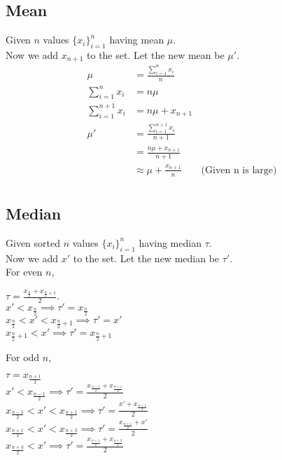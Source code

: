 \documentclass[11pt]{article}
\begin{document}
\subsection*{Mean}
Given $n$ values $\{x_i\}^n_{i=1}$ having mean $\mu$.\\
Now we add $x_{n+1}$ to the set. Let the new mean be $\mu'$.
\begin{equation*}
    \begin{split}
    \mu &= \frac{\sum_{i=1}^{n} x_i}{n} \\
    \sum_{i=1}^{n} x_i &= n\mu \\
    \sum_{i=1}^{n+1} x_i &= n\mu + x_{n+1} \\
    \mu' &= \frac{\sum_{i=1}^{n+1} x_i}{n+1} \\
        &= \frac{n\mu + x_{n+1}}{n+1} \\
        &\approx \mu + \frac{x_{n+1}}{n} \hspace{2em} \text{(Given n is large)} \\
    \end{split}
\end{equation*}

\subsection*{Median}
Given sorted $n$ values $\{x_i\}^n_{i=1}$ having median $\tau$. \\
Now we add $x'$ to the set. Let the new median be $\tau'$. \\

For even $n$,
\begin{center}
$\tau = \frac{x_{\frac{n}{2}} + x_{\frac{n}{2}+1}}{2}$.\\
$x' < x_{\frac{n}{2}} \implies \tau' = x_{\frac{n}{2}}$ \\
$x_{\frac{n}{2}} < x' < x_{\frac{n}{2}+1} \implies \tau' = x'$ \\
$x_{\frac{n}{2}+1} < x' \implies \tau' = x_{\frac{n}{2}+1}$ \\
\end{center}

For odd $n$,
\begin{center}
$\tau = x_{\frac{n+1}{2}}$ \\
$x' < x_{\frac{n-1}{2}} \implies \tau' = \frac{x_{\frac{n-1}{2}} + x_{\frac{n+1}{2}}}{2}$ \\
$x_{\frac{n-1}{2}} < x' < x_{\frac{n+1}{2}} \implies \tau' = \frac{x' + x_{\frac{n+1}{2}}}{2}$ \\
$x_{\frac{n+1}{2}} < x' < x_{\frac{n+3}{2}} \implies \tau' = \frac{x_{\frac{n+1}{2}} + x'}{2}$ \\
$x_{\frac{n+3}{2}} < x' \implies \tau' = \frac{x_{\frac{n+1}{2}} + x_{\frac{n+3}{2}}}{2}$
\end{center}
\end{document}
